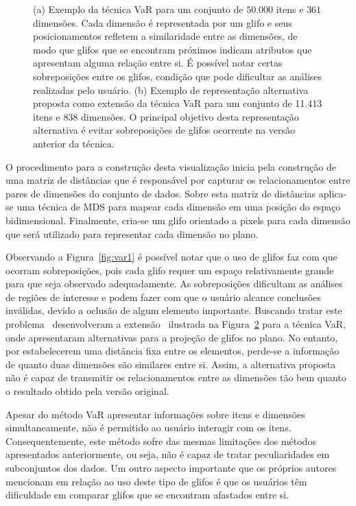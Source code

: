 \begin{figure}[h!]
\begin{subfigure}[b]{0.475\textwidth}
    \caption{}
    \label{fig:var2}
  \end{subfigure}
  \caption[VaR: Value and Relation]{(a) Exemplo da técnica VaR para um conjunto de $50.000$ itens e $361$ dimensões. Cada dimensão é representada por um glifo e seus posicionamentos refletem a similaridade entre as dimensões, de modo que glifos que se encontram próximos indicam atributos que apresentam alguma relação entre si. É possível notar certas sobreposições entre os glifos, condição que pode dificultar as análises realizadas pelo usuário. (b) Exemplo de representação alternativa proposta como extensão da técnica VaR para um conjunto de 11.413 itens e 838 dimensões. O principal objetivo desta representação alternativa é evitar sobreposições de glifos ocorrente na versão anterior da técnica.}
\end{figure}

O procedimento para a construção desta visualização inicia pela construção de uma matriz de distâncias que é responsável por capturar os relacionamentos entre pares de dimensões do conjunto de dados. 
Sobre esta matriz de distâncias aplica-se uma técnica de MDS para mapear cada dimensão em uma posição do espaço bidimensional. 
Finalmente, cria-se um glifo orientado a pixels para cada dimensão que será utilizado para representar cada dimensão no plano.

Observando a Figura~\ref{fig:var1} é possível notar que o uso de glifos faz com que ocorram sobreposições, pois cada glifo requer um espaço relativamente grande para que seja observado adequadamente. 
As sobreposições dificultam as análises de regiões de interesse e podem fazer com que o usuário alcance conclusões inválidas, devido a oclusão de algum elemento importante. 
Buscando tratar este problema~\citeauthor{Yang2007} desenvolveram a extensão~\cite{Yang2007} ilustrada na Figura~\ref{fig:var2} para a técnica VaR, onde apresentaram alternativas para a projeção de glifos no plano. No entanto, por estabelecerem uma distância fixa entre os elementos, perde-se a informação de quanto duas dimensões são similares entre si. Assim, a alternativa proposta não é capaz de transmitir os relacionamentos entre as dimensões tão bem quanto o resultado obtido pela versão original.

Apesar do método VaR apresentar informações sobre itens e dimensões simultaneamente, não é permitido ao usuário interagir com os itens. Consequentemente, este método sofre das mesmas limitações dos métodos apresentados anteriormente, ou seja, não é capaz de tratar peculiaridades em subconjuntos dos dados. 
Um outro aspecto importante que os próprios autores mencionam em relação ao uso deste tipo de  glifos é que os usuários têm dificuldade em comparar glifos que se encontram afastados entre si. 

